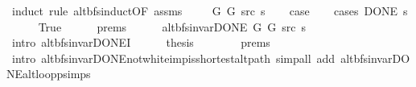 \begin{isabellebody}
\ {\isacharparenleft}{\kern0pt}induct\ rule{\isacharcolon}{\kern0pt}\ alt{\isacharunderscore}{\kern0pt}bfs{\isacharunderscore}{\kern0pt}induct{\isacharbrackleft}{\kern0pt}OF\ assms{\isacharparenleft}{\kern0pt}{}{\isacharparenright}{\kern0pt}{\isacharbrackright}{\kern0pt}{\isacharparenright}{\kern0pt}\isanewline
\ \ \isamarkupfalse%
\ {\isacharparenleft}{\kern0pt}{}\ G{}\ G{}\ src\ s{\isacharparenright}{\kern0pt}\isanewline
\ \ \isamarkupfalse%
\ {\isacharquery}{\kern0pt}case\isanewline
\ \ \isamarkupfalse%
\ {\isacharparenleft}{\kern0pt}cases\ {\isachardoublequoteopen}DONE\ s{\isachardoublequoteclose}{\isacharparenright}{\kern0pt}\isanewline
\ \ \ \ \isamarkupfalse%
\ True\isanewline
\ \ \ \ \isamarkupfalse%
\ {\isachardoublequoteopen}{}{\isachardot}{\kern0pt}prems{\isachardoublequoteclose}{\isacharparenleft}{\kern0pt}{}{\isacharparenright}{\kern0pt}\isanewline
\ \ \ \ \isamarkupfalse%
\ {\isachardoublequoteopen}alt{\isacharunderscore}{\kern0pt}bfs{\isacharunderscore}{\kern0pt}invar{\isacharunderscore}{\kern0pt}DONE{\isacharprime}{\kern0pt}\ G{}\ G{}\ src\ s{\isachardoublequoteclose}\isanewline
\ \ \ \ \ \ \isamarkupfalse%
\ {\isacharparenleft}{\kern0pt}intro\ alt{\isacharunderscore}{\kern0pt}bfs{\isacharunderscore}{\kern0pt}invar{\isacharunderscore}{\kern0pt}DONE{\isacharprime}{\kern0pt}I{\isacharparenright}{\kern0pt}\isanewline
\ \ \ \ \isamarkupfalse%
\ {\isacharquery}{\kern0pt}thesis\isanewline
\ \ \ \ \ \ \isamarkupfalse%
\ {\isachardoublequoteopen}{}{\isachardot}{\kern0pt}prems{\isachardoublequoteclose}{\isacharparenleft}{\kern0pt}{}{\isacharparenright}{\kern0pt}\isanewline
\ \ \ \ \ \ \isamarkupfalse%
\ {\isacharparenleft}{\kern0pt}intro\ alt{\isacharunderscore}{\kern0pt}bfs{\isacharunderscore}{\kern0pt}invar{\isacharunderscore}{\kern0pt}DONE{\isachardot}{\kern0pt}not{\isacharunderscore}{\kern0pt}white{\isacharunderscore}{\kern0pt}imp{\isacharunderscore}{\kern0pt}is{\isacharunderscore}{\kern0pt}shortest{\isacharunderscore}{\kern0pt}alt{\isacharunderscore}{\kern0pt}path{\isacharparenright}{\kern0pt}\ {\isacharparenleft}{\kern0pt}simp{\isacharunderscore}{\kern0pt}all\ add{\isacharcolon}{\kern0pt}\ alt{\isacharunderscore}{\kern0pt}bfs{\isacharunderscore}{\kern0pt}invar{\isacharunderscore}{\kern0pt}DONE{\isachardot}{\kern0pt}alt{\isacharunderscore}{\kern0pt}loop{\isacharunderscore}{\kern0pt}psimps{\isacharparenright}{\kern0pt}\isanewline

\end{isabellebody}
